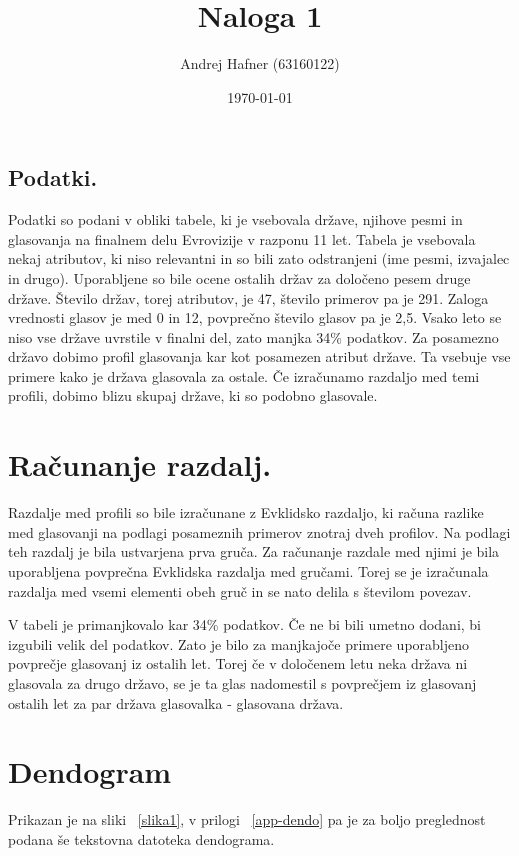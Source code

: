 \documentclass[a4paper,11pt]{article}
\title{Naloga 1}
\author{Andrej Hafner (63160122)}
\date{\today}
\begin{document}
\maketitle

\subsection{Podatki.}
Podatki so podani v obliki tabele, ki je vsebovala države, njihove pesmi in glasovanja na finalnem delu Evrovizije v razponu 11 let. Tabela je vsebovala nekaj atributov, ki niso relevantni in so bili zato odstranjeni (ime pesmi, izvajalec in drugo). Uporabljene so bile ocene ostalih držav za določeno pesem druge države. Število držav, torej atributov, je 47, število primerov pa je 291. Zaloga vrednosti glasov je med 0 in 12, povprečno število glasov pa je 2,5. Vsako leto se niso vse države uvrstile v finalni del, zato manjka 34\% podatkov. Za posamezno državo dobimo profil glasovanja kar kot posamezen atribut države. Ta vsebuje vse primere kako je država glasovala za ostale. Če izračunamo razdaljo med temi profili, dobimo blizu skupaj države, ki so podobno glasovale.

\section{Računanje razdalj.}
Razdalje med profili so bile izračunane z Evklidsko razdaljo, ki računa razlike med glasovanji na podlagi posameznih primerov znotraj dveh profilov. Na podlagi teh razdalj je bila ustvarjena prva gruča. Za računanje razdale med njimi je bila uporabljena povprečna Evklidska razdalja med gručami. Torej se je izračunala razdalja med vsemi elementi obeh gruč in se nato delila s številom povezav. 

V tabeli je primanjkovalo kar 34\% podatkov. Če ne bi bili umetno dodani, bi izgubili velik del podatkov. Zato je bilo za manjkajoče primere uporabljeno povprečje glasovanj iz ostalih let. Torej če v določenem letu neka država ni glasovala za drugo državo, se je ta glas nadomestil s povprečjem iz glasovanj ostalih let za par država glasovalka - glasovana država.

\section{Dendogram}
Prikazan je na sliki ~\ref{slika1}, v prilogi ~\ref{app-dendo} pa je za boljo preglednost podana še tekstovna datoteka dendograma.
\end{document}
